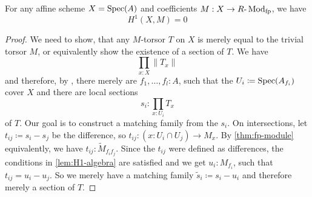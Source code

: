 \begin{theorem}
  For any affine scheme $X=\operatorname{Spec}(A)$ and coefficients $M: X\to R\text{-}\operatorname{Mod}_{\text{fp}}$, we have
  \[ H^1(X,M)=0 \]
\end{theorem}
\begin{proof}
  We need to show, that any $M$-torsor $T$ on $X$ is merely equal to the trivial torsor $M$,
  or equivalently show the existence of a section of $T$.
  We have
  \[ \prod_{x:X}\| T_x \|\]
  and therefore, by ,
  there merely are $f_1,\dots,f_l:A$,
  such that the $U_i\coloneqq \operatorname{Spec}(A_{f_i})$ cover $X$ and
  there are local sections
  \[ s_i:\prod_{x:U_i}T_x\]
  of $T$. Our goal is to construct a matching family from the $s_i$.
  On intersections, let $t_{ij}\coloneqq s_i-s_j$ be the difference, so $t_{ij}:(x : U_i\cap U_j) \to M_x$.
  By \cref{thm:fp-module} equivalently, we have $t_{ij}:\tilde{M}_{f_i f_j}$.
  Since the $t_{ij}$ were defined as differences, the conditions in \cref{lem:H1-algebra} are satisfied and we get
  $u_i:M_{f_i}$, such that $t_{ij}=u_i-u_j$.
  So we merely have a matching family $\tilde{s}_i\coloneqq s_i-u_i$ and therefore merely a section of $T$.
\end{proof}
